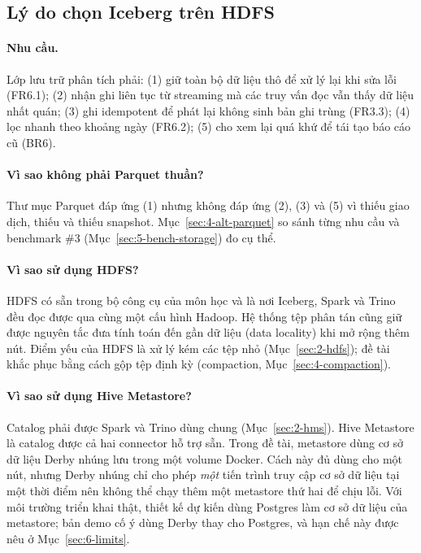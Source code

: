 \subsection{Lý do chọn Iceberg trên HDFS}
\label{sec:4-why-iceberg}

\paragraph{Nhu cầu.} Lớp lưu trữ phân tích phải: (1) giữ toàn bộ dữ liệu thô để xử lý lại khi sửa lỗi (FR6.1); (2) nhận ghi liên tục từ streaming mà các truy vấn đọc vẫn thấy dữ liệu nhất quán; (3) ghi idempotent để phát lại không sinh bản ghi trùng (FR3.3); (4) lọc nhanh theo khoảng ngày (FR6.2); (5) cho xem lại quá khứ để tái tạo báo cáo cũ (BR6).

\paragraph{Vì sao không phải Parquet thuần?} Thư mục Parquet đáp ứng (1) nhưng không đáp ứng (2), (3) và (5) vì thiếu giao dịch, thiếu  và thiếu snapshot. Mục~\ref{sec:4-alt-parquet} so sánh từng nhu cầu và benchmark \#3 (Mục~\ref{sec:5-bench-storage}) đo cụ thể.

\paragraph{Vì sao sử dụng HDFS?} HDFS có sẵn trong bộ công cụ của môn học và là nơi Iceberg, Spark và Trino đều đọc được qua cùng một cấu hình Hadoop. Hệ thống tệp phân tán cũng giữ được nguyên tắc đưa tính toán đến gần dữ liệu (data locality) khi mở rộng thêm nút. Điểm yếu của HDFS là xử lý kém các tệp nhỏ (Mục~\ref{sec:2-hdfs}); đề tài khắc phục bằng cách gộp tệp định kỳ (compaction, Mục~\ref{sec:4-compaction}).

\paragraph{Vì sao sử dụng Hive Metastore?} Catalog phải được Spark và Trino dùng chung (Mục~\ref{sec:2-hms}). Hive Metastore là catalog được cả hai connector hỗ trợ sẵn. Trong đề tài, metastore dùng cơ sở dữ liệu Derby nhúng lưu trong một volume Docker. Cách này đủ dùng cho một nút, nhưng Derby nhúng chỉ cho phép \emph{một} tiến trình truy cập cơ sở dữ liệu tại một thời điểm nên không thể chạy thêm một metastore thứ hai để chịu lỗi. Với môi trường triển khai thật, thiết kế dự kiến dùng Postgres làm cơ sở dữ liệu của metastore; bản demo cố ý dùng Derby thay cho Postgres, và hạn chế này được nêu ở Mục~\ref{sec:6-limits}.

